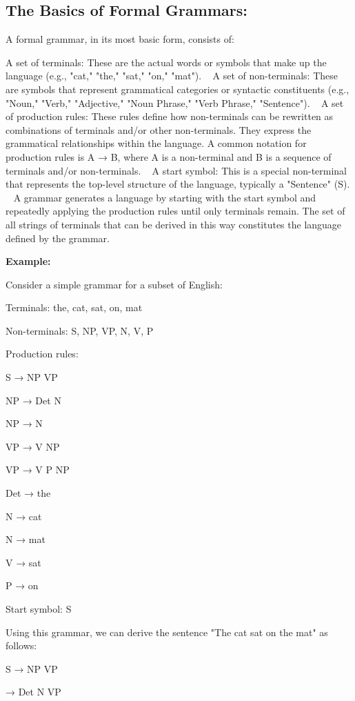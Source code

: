 	\subsection{The Basics of Formal Grammars:}
	
	A formal grammar, in its most basic form, consists of:
	
	A set of terminals: These are the actual words or symbols that make up the language (e.g., "cat," "the," "sat," "on," "mat").   
	A set of non-terminals: These are symbols that represent grammatical categories or syntactic constituents (e.g., "Noun," "Verb," "Adjective," "Noun Phrase," "Verb Phrase," "Sentence").   
	A set of production rules: These rules define how non-terminals can be rewritten as combinations of terminals and/or other non-terminals. They express the grammatical relationships within the language. A common notation for production rules is A → B, where A is a non-terminal and B is a sequence of terminals and/or non-terminals.   
	A start symbol: This is a special non-terminal that represents the top-level structure of the language, typically a "Sentence" (S).   
	A grammar generates a language by starting with the start symbol and repeatedly applying the production rules until only terminals remain.  The set of all strings of terminals that can be derived in this way constitutes the language defined by the grammar.   
	
	\textbf{Example:}
	
	Consider a simple grammar for a subset of English:
	
	Terminals: {the, cat, sat, on, mat}
	
	Non-terminals: {S, NP, VP, N, V, P}
	
	Production rules:
	
	S → NP VP
	
	NP → Det N
	
	NP → N
	
	VP → V NP
	
	VP → V P NP
	
	Det → the
	
	N → cat
	
	N → mat
	
	V → sat
	
	P → on
	
	Start symbol: S
	
	Using this grammar, we can derive the sentence "The cat sat on the mat" as follows:
	
	S → NP VP
	
	→ Det N VP
	
